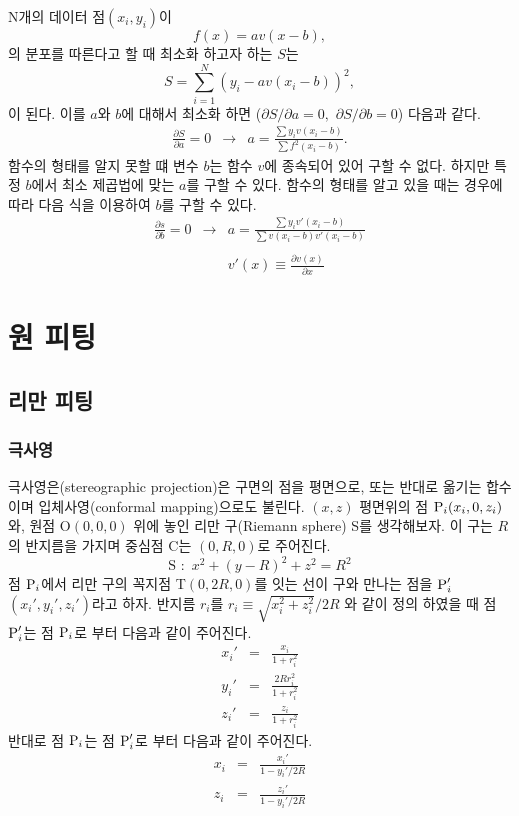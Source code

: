 \documentclass[chapter,a4paper,10pt]{oblivoir}
\begin{document}
N개의 데이터 점$(x_i, y_i)$이
\begin{equation}
f(x) = av(x-b),
\end{equation}
의 분포를 따른다고 할 때 최소화 하고자 하는 $S$는
\begin{equation}
S = \sum_{i=1}^N \left(y_i - av(x_i - b)\right)^2,
\end{equation}
이 된다. 이를 $a$와 $b$에 대해서 최소화 하면
(${\partial S}/{\partial a} = 0,\,\,{\partial S}/{\partial b} = 0$)
다음과 같다.
\begin{eqnarray}
\frac{\partial S}{\partial a} = 0 &\longrightarrow& a = \frac{\sum y_i v(x_i - b)}{\sum f^2(x_i - b)}.%
\end{eqnarray}
함수의 형태를 알지 못할 떄 변수 $b$는 함수 $v$에 종속되어 있어 구할 수 없다. 하지만 특정 $b$에서 최소 제곱법에 맞는 $a$를 구할 수 있다.
함수의 형태를 알고 있을 때는 경우에 따라 다음 식을 이용하여 $b$를 구할 수 있다.
\begin{eqnarray}
\frac{\partial s}{\partial b} = 0 &\longrightarrow& a = \frac{\sum y_i v'(x_i - b)}{\sum v(x_i - b)v'(x_i - b)}\\\nonumber\\
&&v'(x) \equiv \frac{\partial v(x)}{\partial x}
\end{eqnarray}

\chapter{원 피팅}
\section{리만 피팅}
\subsection{극사영}
극사영은(stereographic projection)은 구면의 점을 평면으로,
또는 반대로 옮기는 합수이며 입체사영(conformal mapping)으로도 불린다.
$(x,z)$ 평면위의 점 $\textrm P_i(x_i,0,z_i)$와, 원점 O$(0,0,0)$ 위에 놓인
리만 구(Riemann sphere) S를 생각해보자.
이 구는 $R$의 반지름을 가지며 중심점 C는 $(0, R, 0)$로 주어진다.
\begin{equation}
\textrm{S} \,\,:\,\, x^2 + (y-R)^2 + z^2 = R^2
\end{equation}
점 $\textrm P_i$에서 리만 구의 꼭지점 T$(0,2R,0)$를 잇는 선이
구와 만나는 점을 $\textrm P_i'$$(x_i',y_i',z_i')$라고 하자.
반지름 $r_i$를 $r_i \equiv {\sqrt{x_i^2 + z_i^2}}/{2R}$ 와 같이 정의 하였을 때
점 $\textrm P_i'$는 점 $\textrm P_i$로 부터 다음과 같이 주어진다.
\begin{eqnarray} \label{XDataToXMap}
x_i' &=& \frac{x_i}{1 + r_i^2} \\
y_i' &=& \frac{2Rr_i^2}{1 + r_i^2} \nonumber\\
z_i' &=& \frac{z_i}{1 + r_i^2} \nonumber
\end{eqnarray}
반대로 점 $\textrm P_i$는 점 $\textrm P_i'$로 부터 다음과 같이 주어진다.
\begin{eqnarray}
x_i &=& \frac{x_i'}{1 - y_i'/2R} \\
z_i &=& \frac{z_i'}{1 - y_i'/2R} \nonumber
\end{eqnarray}
\end{document}
